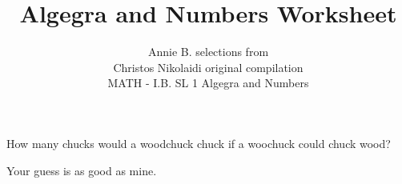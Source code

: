 \documentclass[12pt]{article}
\newenvironment{question}[2][Question]{\begin{trivlist}
\item[\hskip \labelsep {\bfseries #1}\hskip \labelsep {\bfseries #2.}]}{\end{trivlist}}
\newenvironment{answer}[2][Answer]{\begin{trivlist}
\item[\hskip \labelsep {\bfseries #1}\hskip \labelsep {\bfseries #2.}]}{\end{trivlist}}
\begin{document}
 
 
 
\title{Algegra and Numbers Worksheet}
\author{Annie B. selections from\\
Christos Nikolaidi original compilation\\
MATH - I.B. SL 1 Algegra and Numbers}
\maketitle

\begin{question}{1}
  How many chucks would a woodchuck chuck if a woochuck could chuck wood?
\end{question}

\begin{answer}{1}
Your guess is as good as mine.
\end{answer}
 
 
\end{document}
